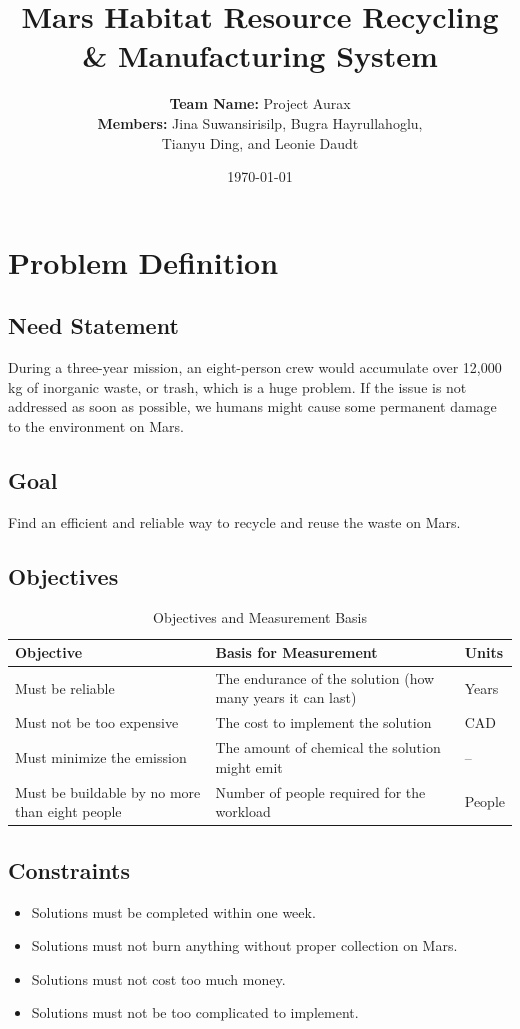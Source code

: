 \documentclass[12pt, a4paper]{article}
\title{\textbf{Mars Habitat Resource Recycling \& Manufacturing System}}
\author{%
    \textbf{Team Name:} Project Aurax \\[0.3em]
    \textbf{Members: }Jina Suwansirisilp, Bugra Hayrullahoglu, \\ Tianyu Ding, and Leonie Daudt 
}
\date{\today}
\begin{document}
\maketitle

\section{Problem Definition}

\subsection{Need Statement}
During a three-year mission, an eight-person crew would accumulate over 12,000 kg of inorganic waste, or trash, which is a huge problem. If the issue is not addressed as soon as possible, we humans might cause some permanent damage to the environment on Mars.

\subsection{Goal}
Find an efficient and reliable way to recycle and reuse the waste on Mars.

\subsection{Objectives}

\begin{table}[h!]
\centering
\renewcommand{\arraystretch}{1.3} %
\setlength{\tabcolsep}{8pt} %
\begin{tabular}{p{} p{} p{}}
\toprule
\textbf{Objective} & \textbf{Basis for Measurement} & \textbf{Units} \\ 
\midrule
Must be reliable & The endurance of the solution (how many years it can last) & Years \\[0.3em]
Must not be too expensive & The cost to implement the solution & CAD \\[0.3em]
Must minimize the emission & The amount of chemical the solution might emit & -- \\[0.3em]
Must be buildable by no more than eight people & Number of people required for the workload & People \\
\bottomrule
\end{tabular}
\caption{Objectives and Measurement Basis}
\end{table}

\newpage 
\subsection{Constraints}
\begin{itemize}
    \item Solutions must be completed within one week.
    \item Solutions must not burn anything without proper collection on Mars.
    \item Solutions must not cost too much money.
    \item Solutions must not be too complicated to implement.
\end{itemize}
\end{document}
